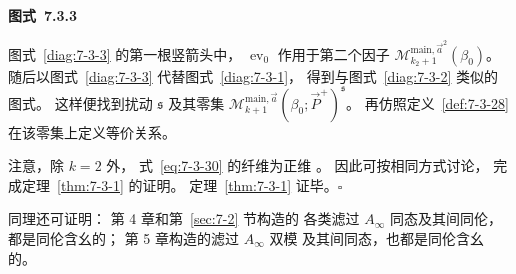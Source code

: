 \par\medskip\noindent\begin{minipage}{\textwidth}
\centering
{}
\par\smallskip
{\renewcommand{\thefigure}{7.3.3}
\normalfont\bfseries 图式~\thefigure\label{diag:7-3-3}}
\end{minipage}\par\medskip

图式~\ref{diag:7-3-3} 的第一根竖箭头中，
$\operatorname{ev}_0$
作用于第二个因子
$\mathcal M^{\mathrm{main},\vec a^2}_{
k_2+1}(\beta_0)$。
随后以图式~\ref{diag:7-3-3}
代替图式~\ref{diag:7-3-1}，
得到与图式~\ref{diag:7-3-2} 类似的图式。
这样便找到扰动 $\mathfrak s$
及其零集
$\mathcal M^{\mathrm{main},\vec a}_{k+1}
(\beta_0;\vec P^+)^{\mathfrak s}$。
再仿照定义~\ref{def:7-3-28}
在该零集上定义等价关系。

注意，除 $k=2$ 外，
式~\eqref{eq:7-3-30} 的纤维为正维
。
因此可按相同方式讨论，
完成定理~\ref{thm:7-3-1} 的证明。
定理~\ref{thm:7-3-1} 证毕。\hfill$\square$\par

同理还可证明：
第 4 章和第~\ref{sec:7-2} 节构造的
各类滤过 $A_\infty$ 同态及其间同伦，
都是同伦含幺的；
第 5 章构造的滤过 $A_\infty$ 双模
及其间同态，也都是同伦含幺的。

